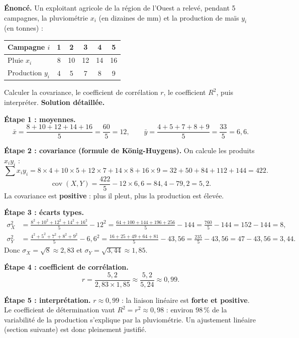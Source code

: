 \documentclass[11pt]{article}
\begin{document}
\begin{exoresolu}
\textbf{Énoncé.} Un exploitant agricole de la région de l'Ouest a relevé, pendant 5 campagnes, la pluviométrie $x_i$ (en dizaines de mm) et la production de maïs $y_i$ (en tonnes) :
\begin{center}
\begin{tabular}{|l|ccccc|}
\hline
\rowcolor{popblueL} Campagne $i$ & 1 & 2 & 3 & 4 & 5 \\
\hline Pluie $x_i$ & 8 & 10 & 12 & 14 & 16 \\
\hline Production $y_i$ & 4 & 5 & 7 & 8 & 9 \\
\hline
\end{tabular}
\end{center}
Calculer la covariance, le coefficient de corrélation $r$, le coefficient $R^2$, puis interpréter.
\tcblower
\textbf{Solution détaillée.}

\textbf{Étape 1 : moyennes.}
\[ \bar{x} = \frac{8+10+12+14+16}{5} = \frac{60}{5} = 12, \qquad \bar{y} = \frac{4+5+7+8+9}{5} = \frac{33}{5} = 6{,}6. \]

\textbf{Étape 2 : covariance (formule de König-Huygens).} On calcule les produits $x_i y_i$ :
\[ \sum x_i y_i = 8\times 4 + 10\times 5 + 12\times 7 + 14\times 8 + 16\times 9 = 32+50+84+112+144 = 422. \]
\[ \operatorname{cov}(X,Y) = \frac{422}{5} - 12 \times 6{,}6 = 84{,}4 - 79{,}2 = 5{,}2. \]
La covariance est \textbf{positive} : plus il pleut, plus la production est élevée.

\textbf{Étape 3 : écarts types.}
\begin{align*}
\sigma_X^2 &= \frac{8^2+10^2+12^2+14^2+16^2}{5} - 12^2 = \frac{64+100+144+196+256}{5} - 144 = \frac{760}{5} - 144 = 152 - 144 = 8,\\
\sigma_Y^2 &= \frac{4^2+5^2+7^2+8^2+9^2}{5} - 6{,}6^2 = \frac{16+25+49+64+81}{5} - 43{,}56 = \frac{235}{5} - 43{,}56 = 47 - 43{,}56 = 3{,}44.
\end{align*}
Donc $\sigma_X = \sqrt{8} \approx 2{,}83$ et $\sigma_Y = \sqrt{3{,}44} \approx 1{,}85$.

\textbf{Étape 4 : coefficient de corrélation.}
\[ r = \frac{5{,}2}{2{,}83 \times 1{,}85} \approx \frac{5{,}2}{5{,}24} \approx 0{,}99. \]

\textbf{Étape 5 : interprétation.} $r \approx 0{,}99$ : la liaison linéaire est \textbf{forte et positive}. Le coefficient de détermination vaut $R^2 = r^2 \approx 0{,}98$ : environ $98\,\%$ de la variabilité de la production s'explique par la pluviométrie. Un ajustement linéaire (section suivante) est donc pleinement justifié.
\end{exoresolu}
\end{document}

